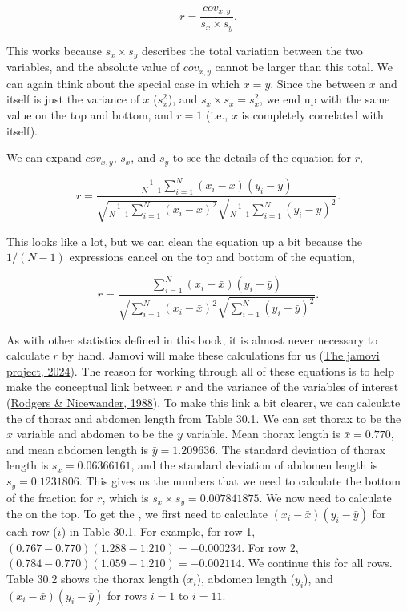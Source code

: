 \documentclass[
  openany]{krantz}
\begin{document}
\[r = \frac{cov_{x,y}}{s_{x} \times s_{y}}.\]

This works because \(s_{x} \times s_{y}\) describes the total variation between the two variables, and the absolute value of \(cov_{x,y}\) cannot be larger than this total.
We can again think about the special case in which \(x = y\).
Since the  between \(x\) and itself is just the variance of \(x\) (\(s_{x}^{2}\)), and \(s_{x} \times s_{x} = s^{2}_{x}\), we end up with the same value on the top and bottom, and \(r = 1\) (i.e., \(x\) is completely correlated with itself).

We can expand \(cov_{x,y}\), \(s_{x}\), and \(s_{y}\) to see the details of the equation for \(r\),

\[r = \frac{\frac{1}{N - 1} \sum_{i = 1}^{N}\left(x_{i} - \bar{x} \right) \left(y_{i} - \bar{y} \right)}{\sqrt{\frac{1}{N - 1}\sum_{i = 1}^{N}\left(x_{i} - \bar{x} \right)^{2}} \sqrt{\frac{1}{N - 1}\sum_{i = 1}^{N}\left(y_{i} - \bar{y} \right)^{2}}}.\]

This looks like a lot, but we can clean the equation up a bit because the \(1 / (N-1)\) expressions cancel on the top and bottom of the equation,

\[r = \frac{\sum_{i = 1}^{N}\left(x_{i} - \bar{x} \right) \left(y_{i} - \bar{y} \right)}{\sqrt{\sum_{i = 1}^{N}\left(x_{i} - \bar{x} \right)^{2}} \sqrt{\sum_{i = 1}^{N}\left(y_{i} - \bar{y} \right)^{2}}}.\]

As with other statistics defined in this book, it is almost never necessary to calculate \(r\) by hand.
Jamovi will make these calculations for us (\protect\hyperlink{ref-Jamovi2022}{The jamovi project, 2024}).
The reason for working through all of these equations is to help make the conceptual link between \(r\) and the variance of the variables of interest (\protect\hyperlink{ref-Rodgers1988}{Rodgers \& Nicewander, 1988}).
To make this link a bit clearer, we can calculate the  of thorax and abdomen length from Table 30.1.
We can set thorax to be the \(x\) variable and abdomen to be the \(y\) variable.
Mean thorax length is \(\bar{x} = 0.770\), and mean abdomen length is \(\bar{y} = 1.209636\).
The standard deviation of thorax length is \(s_{x} = 0.06366161\), and the standard deviation of abdomen length is \(s_{y} = 0.1231806\).
This gives us the numbers that we need to calculate the bottom of the fraction for \(r\), which is \(s_{x} \times s_{y} = 0.007841875\).
We now need to calculate the  on the top.
To get the , we first need to calculate \(\left(x_{i} - \bar{x} \right) \left(y_{i} - \bar{y} \right)\) for each row (\(i\)) in Table 30.1.
For example, for row 1, \(\left(0.767 - 0.770\right) \left(1.288 - 1.210\right) = -0.000234.\)
For row 2, \(\left(0.784 - 0.770\right) \left(1.059 - 1.210\right) = -0.002114.\)
We continue this for all rows.
Table 30.2 shows the thorax length (\(x_{i}\)), abdomen length (\(y_{i}\)), and \(\left(x_{i} - \bar{x} \right) \left(y_{i} - \bar{y} \right)\) for rows \(i = 1\) to \(i = 11\).
\end{document}
